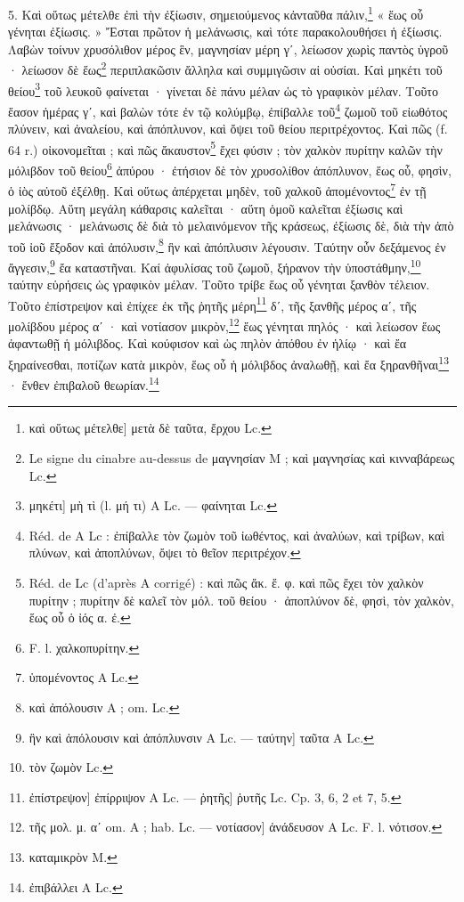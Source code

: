 \documentclass[a4paper, 11pt, oneside, polutonikogreek, french]{article}
\begin{document}
5. Καὶ οὕτως μέτελθε ἐπὶ τὴν ἐξίωσιν, σημειούμενος κἀνταῦθα πάλιν,\footnote{καὶ οὕτως μέτελθε] μετὰ δὲ ταῦτα, ἔρχου Lc.} « ἕως οὗ γένηται ἐξίωσις. » Ἔσται πρῶτον ἡ μελάνωσις, καὶ τότε παρακολουθήσει ἡ ἐξίωσις. Λαβὼν τοίνυν χρυσόλιθον μέρος ἓν, μαγνησίαν μέρη γʹ, λείωσον χωρὶς παντὸς ὑγροῦ · λείωσον δὲ ἕως\footnote{Le signe du cinabre au-dessus de μαγνησίαν M ; καὶ μαγνησίας καὶ κινναβάρεως Lc.} περιπλακῶσιν ἄλληλα καὶ συμμιγῶσιν αἱ οὐσίαι. Καὶ μηκέτι τοῦ θείου\footnote{μηκέτι] μὴ τὶ (l. μή τι) A Lc. --- φαίνηται Lc.} τοῦ λευκοῦ φαίνεται · γίνεται δὲ πάνυ μέλαν ὡς τὸ γραφικὸν μέλαν. Τοῦτο ἔασον ἡμέρας γʹ, καὶ βαλὼν τότε ἐν τῷ κολύμβῳ, ἐπίβαλλε τοῦ\footnote{Réd. de A Lc : ἐπίβαλλε τὸν ζωμὸν τοῦ ἰωθέντος, καὶ ἀναλύων, καὶ τρίβων, καὶ πλύνων, καὶ ἀποπλύνων, ὄψει τὸ θεῖον περιτρέχον.} ζωμοῦ τοῦ εἰωθότος πλύνειν, καὶ ἀναλείου, καὶ ἀπόπλυνον, καὶ ὄψει τοῦ θείου περιτρέχοντος. Καὶ πῶς (f. 64 r.) οἰκονομεῖται ; καὶ πῶς ἄκαυστον\footnote{Réd. de Lc (d'après A corrigé) : καὶ πῶς ἄκ. ἔ. φ. καὶ πῶς ἔχει τὸν χαλκὸν πυρίτην ; πυρίτην δὲ καλεῖ τὸν μόλ. τοῦ θείου · ἀποπλύνον δὲ, φησὶ, τὸν χαλκὸν, ἕως οὗ ὁ ἰός α. ἐ.} ἔχει φύσιν ; τὸν χαλκὸν πυρίτην καλῶν τὴν μόλιβδον τοῦ θείου\footnote{F. l. χαλκοπυρίτην.} ἀπύρου · ἐτήσιον δὲ τὸν χρυσολίθον ἀπόπλυνον, ἕως οὗ, φησὶν, ὁ ἰὸς αὐτοῦ ἐξέλθῃ. Καὶ οὕτως ἀπέρχεται μηδὲν, τοῦ χαλκοῦ ἀπομένοντος\footnote{ὑπομένοντος A Lc.} ἐν τῇ μολίβδῳ. Αὕτη μεγάλη κάθαρσις καλεῖται · αὕτη ὁμοῦ καλεῖται ἐξίωσις καὶ μελάνωσις · μελάνωσις δὲ διὰ τὸ μελαινόμενον τῆς κράσεως, ἐξίωσις δὲ, διὰ τὴν ἀπὸ τοῦ ἰοῦ ἔξοδον καὶ ἀπόλυσιν,\footnote{καὶ ἀπόλουσιν A ; om. Lc.} ἣν καὶ ἀπόπλυσιν λέγουσιν. Ταύτην οὖν δεξάμενος ἐν ἄγγεσιν,\footnote{ἣν καὶ ἀπόλουσιν καὶ ἀπόπλυνσιν A Lc. --- ταύτην] ταῦτα A Lc.} ἔα καταστῆναι. Καί ἀφυλίσας τοῦ ζωμοῦ, ξήρανον τὴν ὑποστάθμην,\footnote{τὸν ζωμὸν Lc.} ταύτην εὑρήσεις ὡς γραφικὸν μέλαν. Τοῦτο τρίβε ἕως οὗ γένηται ξανθὸν τέλειον. Τοῦτο ἐπίστρεψον καὶ ἐπίχεε ἐκ τῆς ῥητῆς μέρη\footnote{ἐπίστρεψον] ἐπίρριψον A Lc. --- ῥητῆς] ῥυτῆς Lc. Cp. 3, 6, 2 et 7, 5.} δʹ, τῆς ξανθῆς μέρος αʹ, τῆς μολίβδου μέρος αʹ · καὶ νοτίασον μικρὸν,\footnote{τῆς μολ. μ. αʹ om. A ; hab. Lc. --- νοτίασον] ἀνάδευσον A Lc. F. l. νότισον.} ἕως γένηται πηλός · καὶ λείωσον ἕως ἀφαντωθῇ ἡ μόλιβδος. Καὶ κούφισον καὶ ὡς πηλὸν ἀπόθου ἐν ἡλίῳ · καὶ ἔα ξηραίνεσθαι, ποτίζων κατὰ μικρὸν, ἕως οὗ ἡ μόλιβδος ἀναλωθῇ, καὶ ἔα ξηρανθῆναι\footnote{καταμικρὸν M.} · ἔνθεν ἐπιβαλοῦ θεωρίαν.\footnote{ἐπιβάλλει A Lc.}
\end{document}
